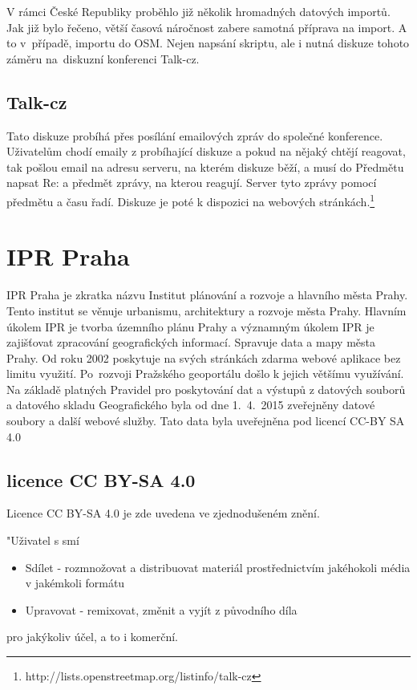 V rámci České Republiky proběhlo již několik hromadných datových importů. Jak 
již bylo řečeno, větší časová náročnost zabere samotná příprava na import. A to
v~případě, importu do OSM. Nejen napsání skriptu, ale i nutná diskuze tohoto záměru
na~diskuzní konferenci Talk-cz. 

\subsection{Talk-cz}
\label{Talk-cz}
Tato diskuze probíhá přes posílání emailových zpráv do společné konference. 
Uživatelům chodí emaily z probíhající diskuze a pokud na nějaký chtějí reagovat,
tak pošlou email na adresu serveru, na kterém diskuze běží, a musí do Předmětu 
napsat Re: a předmět zprávy, na kterou reagují. Server tyto zprávy pomocí 
předmětu a času řadí. Diskuze je poté k dispozici na webových stránkách.\footnote{http://lists.openstreetmap.org/listinfo/talk-cz}

\section{IPR Praha}
\label{IPR Praha}
IPR Praha je zkratka názvu Institut plánování a rozvoje a hlavního města Prahy. 
Tento institut se věnuje urbanismu, architektury a rozvoje města Prahy. Hlavním
úkolem IPR je tvorba územního plánu Prahy a významným úkolem IPR je zajišťovat
zpracování geografických informací. Spravuje data a mapy města Prahy. Od roku 
2002 poskytuje na svých stránkách zdarma webové aplikace bez limitu využití. 
Po~rozvoji Pražského geoportálu došlo k jejich většímu využívání.  Na základě 
platných Pravidel pro poskytování dat a  výstupů z datových souborů a datového 
skladu Geografického byla od dne 1.~4.~2015 zveřejněny datové soubory a další 
webové služby. Tato data byla uveřejněna pod licencí CC-BY SA 4.0 \cite{IPR}
\subsection{licence CC BY-SA 4.0}
\label{licence CC BY-SA 4.0}
Licence CC BY-SA 4.0 je zde uvedena ve zjednodušeném znění.

"Uživatel s smí
\begin{itemize}
    \item   Sdílet - rozmnožovat a distribuovat materiál prostřednictvím jakéhokoli média v jakémkoli formátu
    \item   Upravovat - remixovat, změnit a vyjít z původního díla
\end{itemize}
pro jakýkoliv účel, a to i komerční.

